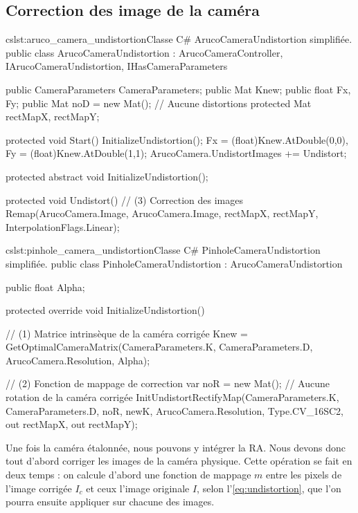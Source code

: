 \subsection{Correction des image de la caméra}
\label{subsec:pinhole_camera_undistortion}


\begin{listingETS}{cs}{lst:aruco_camera_undistortion}{Classe C\# ArucoCameraUndistortion simplifiée.}
  public class ArucoCameraUndistortion : ArucoCameraController, IArucoCameraUndistortion, IHasCameraParameters
  {
    public CameraParameters CameraParameters;
    public Mat Knew;
    public float Fx, Fy;
    public Mat noD = new Mat(); // Aucune distortions
    protected Mat rectMapX, rectMapY;

    protected void Start()
    {
      InitializeUndistortion();
      Fx = (float)Knew.AtDouble(0,0), Fy = (float)Knew.AtDouble(1,1);
      ArucoCamera.UndistortImages += Undistort;
    }

    protected abstract void InitializeUndistortion();

    protected void Undistort() // (3) Correction des images
    {
      Remap(ArucoCamera.Image, ArucoCamera.Image, rectMapX, rectMapY, InterpolationFlags.Linear);
    }
  }
\end{listingETS}

\begin{listingETS}{cs}{lst:pinhole_camera_undistortion}{Classe C\# PinholeCameraUndistortion simplifiée.}
  public class PinholeCameraUndistortion : ArucoCameraUndistortion
  {
    public float Alpha;

    protected override void InitializeUndistortion()
    {
      // (1) Matrice intrinsèque de la caméra corrigée
      Knew = GetOptimalCameraMatrix(CameraParameters.K, CameraParameters.D, ArucoCamera.Resolution, Alpha);

      // (2) Fonction de mappage de correction
      var noR = new Mat(); // Aucune rotation de la caméra corrigée
      InitUndistortRectifyMap(CameraParameters.K, CameraParameters.D, noR, newK, ArucoCamera.Resolution, Type.CV_16SC2, out rectMapX, out rectMapY);
    }
  }
\end{listingETS}

Une fois la caméra étalonnée, nous pouvons y intégrer la RA. Nous devons donc tout d'abord corriger les images de la caméra physique. Cette opération se fait en deux temps : on calcule d'abord une fonction de mappage $m$ entre les pixels de l'image corrigée $I_c$ et ceux l'image originale $I$, selon l'\autoref{eq:undistortion}, que l'on pourra ensuite appliquer sur chacune des images.

